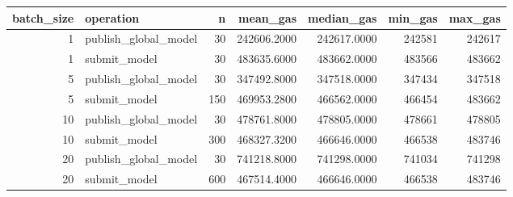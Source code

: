 \begin{tabular}{rlrrrrr}
\toprule
batch\_size & operation & n & mean\_gas & median\_gas & min\_gas & max\_gas \\
\midrule
1 & publish\_global\_model & 30 & 242606.2000 & 242617.0000 & 242581 & 242617 \\
1 & submit\_model & 30 & 483635.6000 & 483662.0000 & 483566 & 483662 \\
5 & publish\_global\_model & 30 & 347492.8000 & 347518.0000 & 347434 & 347518 \\
5 & submit\_model & 150 & 469953.2800 & 466562.0000 & 466454 & 483662 \\
10 & publish\_global\_model & 30 & 478761.8000 & 478805.0000 & 478661 & 478805 \\
10 & submit\_model & 300 & 468327.3200 & 466646.0000 & 466538 & 483746 \\
20 & publish\_global\_model & 30 & 741218.8000 & 741298.0000 & 741034 & 741298 \\
20 & submit\_model & 600 & 467514.4000 & 466646.0000 & 466538 & 483746 \\
\bottomrule
\end{tabular}
